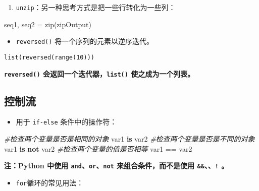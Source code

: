 \documentclass[utf-8]{ctexart}
\newenvironment{Shaded}{}{}
\newcommand{\KeywordTok}[1]{\textcolor[rgb]{0.00,0.44,0.13}{\textbf{#1}}}
\newcommand{\CommentTok}[1]{\textcolor[rgb]{0.38,0.63,0.69}{\textit{#1}}}
\newcommand{\OperatorTok}[1]{\textcolor[rgb]{0.40,0.40,0.40}{#1}}
\newcommand{\BuiltInTok}[1]{#1}
\newcommand{\NormalTok}[1]{#1}
\begin{document}
\begin{enumerate}
\def\labelenumi{\arabic{enumi}.}
\item
  \texttt{unzip}：另一种思考方式是把一些行转化为一些列：
\end{enumerate}

\begin{Shaded}
\begin{Highlighting}[]
\NormalTok{seq1, seq2 }\OperatorTok{=} \BuiltInTok{zip}\NormalTok{(zipOutput)}
\end{Highlighting}
\end{Shaded}

\begin{itemize}
\item
  \texttt{reversed()} 将一个序列的元素以逆序迭代。
\end{itemize}

\begin{verbatim}
list(reversed(range(10))) 
\end{verbatim}

\textbf{\texttt{reversed()} 会返回一个迭代器，\texttt{list()}
使之成为一个列表。}

\hypertarget{header-n307}{\subsection{控制流}\label{header-n307}}

\begin{itemize}
\item
  用于 \texttt{if-else} 条件中的操作符：
\end{itemize}

\begin{Shaded}
\begin{Highlighting}[]
\CommentTok{#检查两个变量是否是相同的对象}
\NormalTok{var1 }\KeywordTok{is}\NormalTok{ var2}
\CommentTok{#检查两个变量是否是不同的对象}
\NormalTok{var1 }\KeywordTok{is} \KeywordTok{not}\NormalTok{ var2}
\CommentTok{#检查两个变量的值是否相等}
\NormalTok{var1 }\OperatorTok{==}\NormalTok{ var2}
\end{Highlighting}
\end{Shaded}

\textbf{注：Python 中使用 \texttt{and}、\texttt{or}、\texttt{not}
来组合条件，而不是使用
\texttt{\&\&}、\texttt{\textbar{}\textbar{}}、\texttt{!} 。}

\begin{itemize}
\item
  \texttt{for}循环的常见用法：
\end{itemize}
\end{document}
